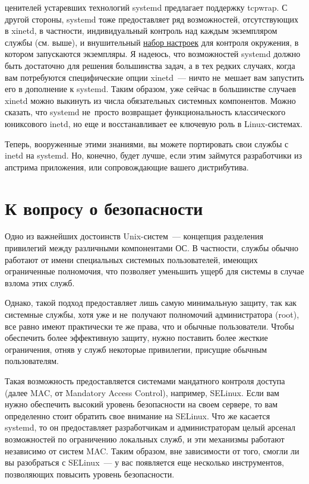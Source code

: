 \documentclass[10pt,oneside,a4paper]{article}
\begin{document}
ценителей устаревших технологий systemd предлагает поддержку tcpwrap.  С другой
стороны, systemd тоже предоставляет ряд возможностей, отсутствующих в xinetd, в
частности, индивидуальный контроль над каждым экземпляром службы (см.  выше), и
внушительный
\href{http://www.freedesktop.org/software/systemd/man/systemd.exec.html}{набор
настроек} для контроля окружения, в котором запускаются экземпляры. Я надеюсь,
что возможностей systemd должно быть достаточно для решения большинства задач, а
в тех редких случаях, когда вам потребуются специфические опции xinetd~--- ничто
не~мешает вам запустить его в дополнение к systemd. Таким образом, уже сейчас в
большинстве случаев xinetd можно выкинуть из числа обязательных системных
компонентов. Можно сказать, что systemd не~просто возвращает функциональность
классического юниксового inetd, но еще и восстанавливает ее ключевую роль в
Linux-системах.

Теперь, вооруженные этими знаниями, вы можете портировать свои службы с inetd на
systemd. Но, конечно, будет лучше, если этим займутся разработчики из апстрима
приложения, или сопровождающие вашего дистрибутива.

\section{К вопросу о безопасности}
\label{sec:security}

Одно из важнейших достоинств Unix-систем~--- концепция разделения привилегий
между различными компонентами ОС. В частности, службы обычно работают от имени
специальных системных пользователей, имеющих ограниченные полномочия, что
позволяет уменьшить ущерб для системы в случае взлома этих служб.

Однако, такой подход предоставляет лишь самую минимальную защиту, так как
системные службы, хотя уже и не~получают полномочий администратора (root), все
равно имеют практически те же права, что и обычные пользователи. Чтобы
обеспечить более эффективную защиту, нужно поставить более жесткие ограничения,
отняв у служб некоторые привилегии, присущие обычным пользователям.

Такая возможность предоставляется системами мандатного контроля доступа (далее
MAC, от Mandatory Access Control), например, SELinux. Если вам нужно обеспечить
высокий уровень безопасности на своем сервере, то вам определенно стоит обратить
свое внимание на SELinux. Что же касается systemd, то он предоставляет
разработчикам и администраторам целый арсенал возможностей по ограничению
локальных служб, и эти механизмы работают независимо от систем MAC.  Таким
образом, вне зависимости от того, смогли ли вы разобраться с SELinux~--- у вас
появляется еще несколько инструментов, позволяющих повысить уровень
безопасности.
\end{document}
